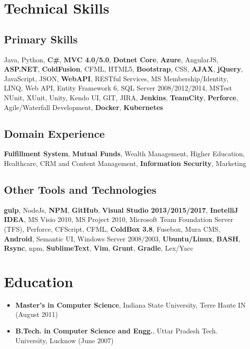 \documentclass[letterpaper,11pt]{article}
\begin{document}
    \section{Technical Skills}
    \subsection{Primary Skills}
    Java, Python, \textbf{C\#}, \textbf{MVC 4.0/5.0}, \textbf{Dotnet Core}, \textbf{Azure}, AngularJS, \textbf{ASP.NET}, \textbf{ColdFusion}, CFML, HTML5, \textbf{Bootstrap}, CSS, \textbf{AJAX}, \textbf{jQuery}, JavaScript, JSON, \textbf{WebAPI}, RESTful Services, MS Membership/Identity, LINQ, Web API, Entity Framework 6, SQL Server 2008/2012/2014, MSTest NUnit, XUnit, Unity, Kendo UI, GIT, JIRA, \textbf{Jenkins}, \textbf{TeamCity}, \textbf{Perforce}, Agile/Waterfall Development, \textbf{Docker}, \textbf{Kubernetes}

    \subsection{Domain Experience}
    \textbf{Fulfillment System}, \textbf{Mutual Funds}, Wealth Management, Higher Education, Healthcare, CRM and Content Management, \textbf{Information Security}, Marketing

    \subsection{Other Tools and Technologies}
    \textbf{gulp}, NodeJs, \textbf{NPM}, \textbf{GitHub}, \textbf{Visual Studio 2013/2015/2017}, \textbf{InetelliJ IDEA}, MS Visio 2010, MS Project 2010, Microsoft Team Foundation Server (TFS), Perforce, CFScript, CFML, \textbf{ColdBox 3.8}, Fusebox, Mura CMS, \textbf{Android}, Semantic UI, Windows Server 2008/2003, \textbf{Ubuntu/Linux}, \textbf{BASH}, \textbf{Rsync}, npm, \textbf{SublimeText}, \textbf{Vim}, \textbf{Grunt}, \textbf{Gradle}, Lex/Yacc

    \section{Education}
    \begin{itemize}
        \item \textbf{Master's in Computer Science}, Indiana State University, Terre Haute IN (August 2011)
        \item \textbf{B.Tech. in Computer Science and Engg.}, Uttar Pradesh Tech. University, Lucknow (June 2007)
    \end{itemize}
\end{document}
